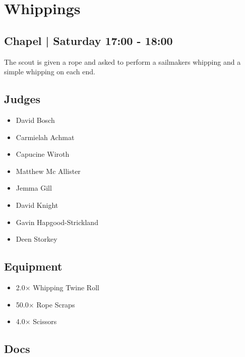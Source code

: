 \documentclass[10pt]{article}
\begin{document}
		\begin{minipage}{\linewidth}
		\setcounter{section}{17}
	\section{Whippings }
	\subsection*{Chapel | Saturday 17:00 - 18:00}

	The scout is given a rope and asked to perform a sailmakers whipping and a simple whipping on each end. 

	\begin{multicols}{2}
	\subsection*{\faUsers \: Judges}
	\begin{itemize}
			\item David Bosch
			\item Carmielah Achmat
			\item Capucine Wiroth
			\item Matthew Mc Allister
			\item Jemma Gill
			\item David Knight
			\item Gavin Hapgood-Strickland
			\item Deen Storkey
		\end{itemize}
	\columnbreak
	\subsection*{\faWrench \: Equipment}
	
        \begin{itemize}
                    \item 2.0$\times$ \: Whipping Twine Roll
                    \item 50.0$\times$ \: Rope Scraps
                    \item 4.0$\times$ \: Scissors
                \end{itemize}
                \vfill\null
        \subsection*{\faFile \: Docs}
     	\end{multicols}


	\vspace{1cm}
	\end{minipage}
\end{document}
